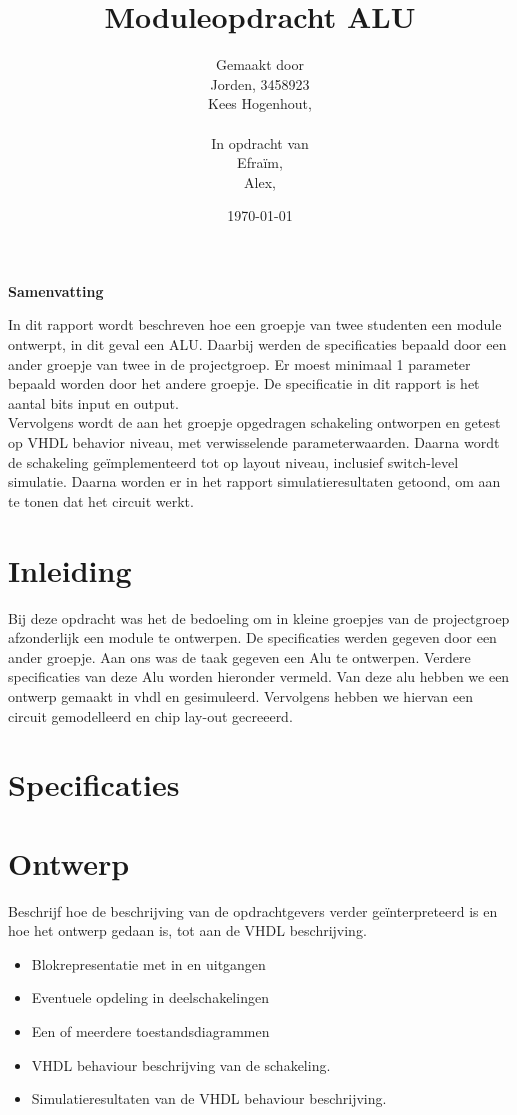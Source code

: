 \documentclass[11pt,twoside,a4paper]{article}
\title{Moduleopdracht ALU}
\author{
Gemaakt door\\
Jorden, 3458923\\
Kees Hogenhout, \\
\\
In opdracht van \\
Efraïm, \\
Alex, \\
}
\date{\today}
\begin{document}
\thispagestyle{empty}
\vspace{30 mm}

\begin{center}
\Large \bf 
Samenvatting
\end{center}
In dit rapport wordt beschreven hoe een groepje van twee studenten een module ontwerpt, in dit geval een ALU. Daarbij werden de specificaties bepaald door een ander groepje van twee in de projectgroep. Er moest minimaal 1 parameter bepaald worden door het andere groepje. De specificatie in dit rapport is het aantal bits input en output. \newline \\
Vervolgens  wordt de aan het groepje opgedragen schakeling ontworpen en getest op VHDL behavior niveau, met verwisselende parameterwaarden. Daarna wordt de schakeling geïmplementeerd tot op layout niveau, inclusief switch-level simulatie. 
Daarna worden er in het rapport simulatieresultaten getoond, om aan te tonen dat het circuit werkt. 
\clearpage

\tableofcontents
\clearpage

\section{Inleiding}
Bij deze opdracht was het de bedoeling om in kleine groepjes van de projectgroep afzonderlijk een module te ontwerpen. De specificaties werden gegeven door een ander groepje. Aan ons was de taak gegeven een Alu te ontwerpen. Verdere specificaties van deze Alu worden hieronder vermeld. Van deze  alu hebben we een ontwerp gemaakt in vhdl en gesimuleerd. Vervolgens hebben we hiervan een circuit gemodelleerd en chip lay-out gecreeerd. 

\section{Specificaties}
\scriptsize

\normalsize

\section{Ontwerp}
Beschrijf hoe de beschrijving van de opdrachtgevers verder geïnterpreteerd is en hoe het ontwerp gedaan is, tot aan de VHDL beschrijving.
\begin{itemize}
\item
Blokrepresentatie met in en uitgangen
\item
Eventuele opdeling in deelschakelingen
\item
Een of meerdere toestandsdiagrammen 
\item
VHDL behaviour beschrijving van de schakeling.
\item
Simulatieresultaten van de VHDL behaviour beschrijving.
\end{itemize}
\end{document}
